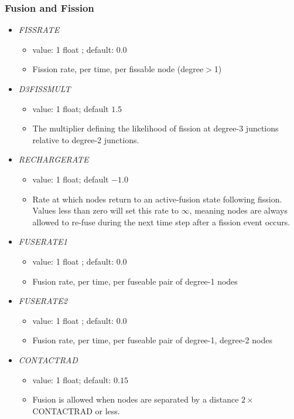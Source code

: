 \documentclass[12pt]{article}
\begin{document}
\subsubsection*{Fusion and Fission}
\begin{itemize}
%
\item {\it FISSRATE}
  \begin{itemize}
    \item  value: 1 float ; default: $0.0$
    \item Fission rate, per time, per fissable node (degree$>$1)
  \end{itemize}
%
%
\item {\it D3FISSMULT}
  \begin{itemize}
    \item  value: 1 float; default $1.5$
    \item The multiplier defining the likelihood of fission at degree-3 junctions relative to degree-2 junctions.
  \end{itemize}
%
\item {\it RECHARGERATE}
  \begin{itemize}
    \item  value: 1 float; default $-1.0$
    \item Rate at which nodes return to an active-fusion state following fission. Values less than zero will set this rate to $\infty$, meaning nodes are always allowed to re-fuse during the next time step after a fission event occurs.
  \end{itemize}
%
\item {\it FUSERATE1}
  \begin{itemize}
    \item  value: 1 float ; default: $0.0$
    \item Fusion rate, per time, per fuseable pair of degree-1 nodes
  \end{itemize}
%
\item {\it FUSERATE2}
\begin{itemize}
  \item  value: 1 float ; default: $0.0$
  \item Fusion rate, per time, per fuseable pair of degree-1, degree-2 nodes
\end{itemize}
%
\item {\it CONTACTRAD}
  \begin{itemize}
    \item  value: 1 float; default: $0.15$
    \item  Fusion is allowed when nodes are separated by a distance $2\times$CONTACTRAD or less.

\end{itemize}
\end{itemize}
\end{document}
